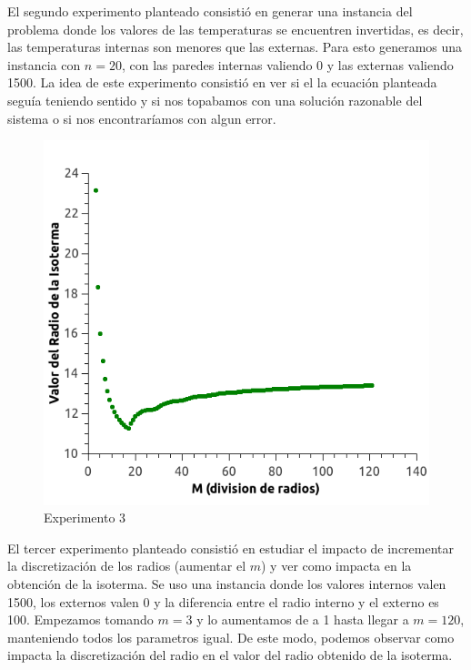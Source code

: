 El segundo experimento planteado consistió en generar una instancia del problema donde los valores de las temperaturas se encuentren invertidas, es decir, las temperaturas internas son menores que las externas. Para esto generamos una instancia con $n=20$, con las paredes internas valiendo 0 y las externas valiendo 1500. La idea de este experimento consistió en ver si el la ecuación planteada seguía teniendo sentido y si nos topabamos con una solución razonable del sistema o si nos encontraríamos con algun error.
\\
\begin{figure}
  \vspace{-20pt}
  \begin{center}
    \includegraphics[scale= 0.4]{imagenes/graphDiscretizacion.png}
  \end{center}
  \vspace{-20pt}
  \caption{Experimento 3}
  \vspace{-10pt}
  \label{fig:Exp3}
\end{figure}

El tercer experimento planteado consistió en estudiar el impacto de incrementar la discretización de los radios (aumentar el $m$) y ver como impacta en la obtención de la isoterma. Se uso una instancia donde los valores internos valen 1500, los externos valen 0 y la diferencia entre el radio interno y el externo es 100. Empezamos tomando $m=3$ y lo aumentamos de a 1 hasta llegar a $m=120$, manteniendo todos los parametros igual. De este modo, podemos observar como impacta la discretización del radio en el valor del radio obtenido de la isoterma.

